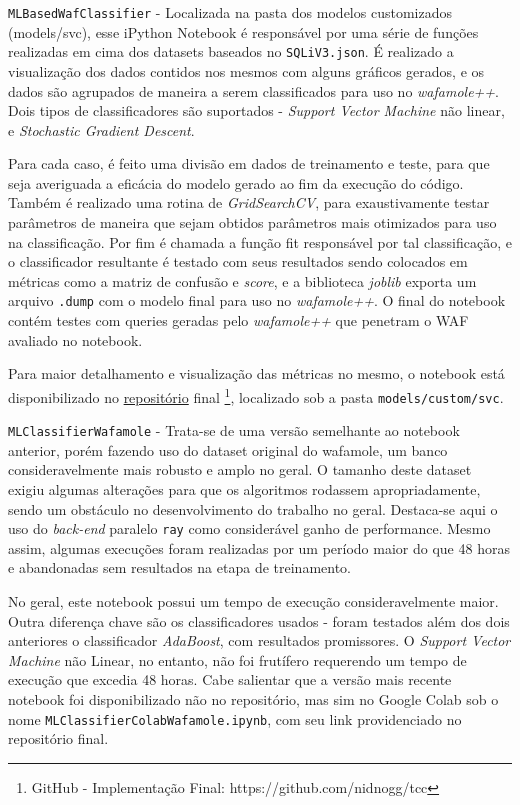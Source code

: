 \begin{alineas}
\begin{alineas}
\end{alineas}
\item \verb+MLBasedWafClassifier+ - Localizada na pasta dos modelos customizados (models/svc), esse iPython Notebook é responsável por uma série de funções realizadas em cima dos datasets baseados no \verb+SQLiV3.json+. É realizado a visualização dos dados contidos nos mesmos com alguns gráficos gerados, e os dados são agrupados de maneira a serem classificados para uso no \textit{wafamole++}. Dois tipos de classificadores são suportados - \textit{Support Vector Machine} não linear, e \textit{Stochastic Gradient Descent}. 

Para cada caso, é feito uma divisão em dados de treinamento e teste, para que seja averiguada a eficácia do modelo gerado ao fim da execução do código. Também é realizado uma rotina de \textit{GridSearchCV}, para exaustivamente testar parâmetros de maneira que sejam obtidos parâmetros mais otimizados para uso na classificação. Por fim é chamada a função fit responsável por tal classificação, e o classificador resultante é testado com seus resultados sendo colocados em métricas como a matriz de confusão e \textit{score}, e a biblioteca \textit{joblib} exporta um arquivo \verb+.dump+ com o modelo final para uso no \textit{wafamole++}. O final do notebook contém testes com queries geradas pelo \textit{wafamole++} que penetram o WAF avaliado no notebook.

Para maior detalhamento e visualização das métricas no mesmo, o notebook está disponibilizado no \href{https://github.com/nidnogg/tcc}{repositório} final \footnote{GitHub - Implementação Final: https://github.com/nidnogg/tcc}, localizado sob a pasta \verb+models/custom/svc+.

\item \verb+MLClassifierWafamole+ - Trata-se de uma versão semelhante ao notebook anterior, porém fazendo uso do dataset original do wafamole, um banco consideravelmente mais robusto e amplo no geral. O tamanho deste dataset exigiu algumas alterações para que os algoritmos rodassem apropriadamente, sendo um obstáculo no desenvolvimento do trabalho no geral. Destaca-se aqui o uso do \textit{back-end} paralelo \verb+ray+ \cite{ray_backend_parallel} como considerável ganho de performance. Mesmo assim, algumas execuções foram realizadas por um período maior do que 48 horas e abandonadas sem resultados na etapa de treinamento.

No geral, este notebook possui um tempo de execução consideravelmente maior. Outra diferença chave são os classificadores usados - foram testados além dos dois anteriores o classificador \textit{AdaBoost}, com resultados promissores. O \textit{Support Vector Machine} não Linear, no entanto, não foi frutífero requerendo um tempo de execução que excedia 48 horas. Cabe salientar que a versão mais recente notebook foi disponibilizado não no repositório, mas sim no Google Colab sob o nome \verb+MLClassifierColabWafamole.ipynb+, com seu link providenciado no repositório final.
\end{alineas}

